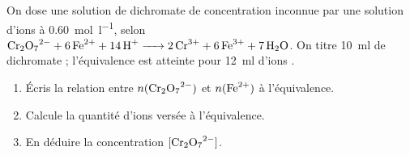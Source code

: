 \documentclass[11pt,a4paper]{article}
\begin{document}
\begin{exo}
On dose une solution de dichromate  de concentration inconnue par une solution d'ions
 à \qty{0.60}{\mole\per\litre}, selon
$\ce{Cr2O7^2- + 6 Fe^2+ + 14 H+ -> 2 Cr^3+ + 6 Fe^3+ + 7 H2O}$.
On titre \qty{10}{\milli\litre} de dichromate ; l'équivalence est atteinte pour \qty{12}{\milli\litre}
d'ions .
\begin{enumerate}[label=\alph*)]
  \item Écris la relation entre $n(\ce{Cr2O7^2-})$ et $n(\ce{Fe^2+})$ à l'équivalence.
  \item Calcule la quantité d'ions  versée à l'équivalence.
  \item En déduire la concentration $[\ce{Cr2O7^2-}]$.
\end{enumerate}
\end{exo}
\end{document}
